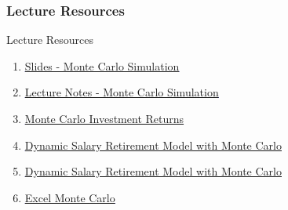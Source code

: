 \documentclass[handout, 11pt]{beamer}
\begin{document}
\begin{frame}
\frametitle{Lecture Resources}
{
\begin{block}{Lecture Resources}
\begin{enumerate}
\item \textcolor{blue}{\underline{\href{https://nickderobertis.github.io/fin-model-course/\_static/generated/pdfs/S10 Monte Carlo Simulation.pdf}{Slides - Monte Carlo Simulation}}}
\item \textcolor{blue}{\underline{\href{https://nickderobertis.github.io/fin-model-course/\_static/generated/pdfs/LN10 Monte Carlo Simulation.pdf}{Lecture Notes - Monte Carlo Simulation}}}
\item \textcolor{blue}{\underline{\href{https://nickderobertis.github.io/fin-model-course/\_static/Examples/Monte Carlo/Python/MC Investment Returns.ipynb}{Monte Carlo Investment Returns}}}
\item \textcolor{blue}{\underline{\href{https://nickderobertis.github.io/fin-model-course/\_static/Examples/Monte Carlo/Python/Dynamic Salary Retirement Model Monte Carlo.ipynb}{Dynamic Salary Retirement Model with Monte Carlo}}}
\item \textcolor{blue}{\underline{\href{https://nickderobertis.github.io/fin-model-course/\_static/Examples/Monte Carlo/Excel/Dynamic Salary Retirement Model with Monte Carlo.xlsx}{Dynamic Salary Retirement Model with Monte Carlo}}}
\item \textcolor{blue}{\underline{\href{https://nickderobertis.github.io/fin-model-course/\_static/Examples/Monte Carlo/Excel/Excel Monte Carlo.ipynb}{Excel Monte Carlo}}}
\end{enumerate}
\vfill
\end{block}
}
\label{frames:resources}
\end{frame}
\end{document}
